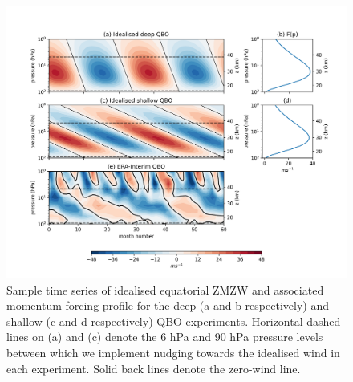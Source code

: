 \begin{figure}[h!]
\begin{center}
\noindent\includegraphics[width = \linewidth]{Figures/Figures-deepQBO/Idealised_QBO_features.png}
\caption[Idealised QBO winds used for nudging experiments]{Sample time series of idealised equatorial ZMZW and associated momentum forcing profile for the deep (a and b respectively) and shallow (c and d respectively) QBO experiments. Horizontal dashed lines on (a) and (c) denote the 6 hPa and 90 hPa pressure levels between which we implement nudging towards the idealised wind in each experiment. Solid back lines denote the zero-wind line.}
\label{fig:Idealised_QBO_samples}
\end{center}
\end{figure}


